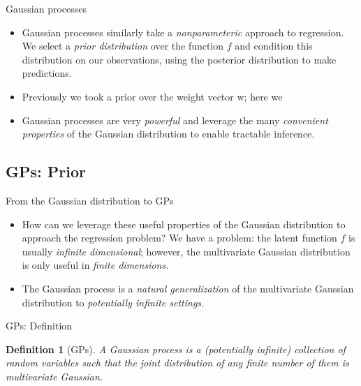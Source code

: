 \documentclass[xcolor={dvipsnames},hyperref={breaklinks=true},12pt]{beamer}
\newtheorem{defn}{Definition}
\renewcommand{\vec}[1]{\bm{\mathrm{#1}}}
\newcommand{\emphr}[1]{{\textcolor{or}{\itshape #1}}}
\begin{document}
\begin{frame}{Gaussian processes}
  \begin{itemize}
  \item Gaussian processes similarly take a \emphr{nonparameteric}
    approach to regression.  We select a \emphr{prior distribution}
    over the function $f$ and condition this distribution on our
    observations, using the posterior distribution to make
    predictions.
  \item Previously we took a prior over the weight vector $\vec{w}$; here
    we
  \item Gaussian processes are very \emphr{powerful} and leverage
    the many \emphr{convenient properties} of the Gaussian
    distribution to enable tractable inference.
  \end{itemize}
\end{frame}

\subsection{GPs: Prior}

\begin{frame}{From the Gaussian distribution to GPs}
  \begin{itemize}
    \item How can we leverage these useful properties of the Gaussian
      distribution to approach the regression problem?  We have a
      problem: the latent function $f$ is usually \emphr{infinite
        dimensional}; however, the multivariate Gaussian distribution
      is only useful in \emphr{finite dimensions.}
    \item The Gaussian process is a \emphr{natural generalization} of
      the multivariate Gaussian distribution to \emphr{potentially
        infinite settings.}
  \end{itemize}
\end{frame}

\begin{frame}{GPs: Definition}
  \begin{defn}[GPs]
    A \emphr{Gaussian process} is a (potentially infinite) collection
    of random variables such that the joint distribution of any finite
    number of them is multivariate Gaussian.
  \end{defn}
\end{frame}
\end{document}
